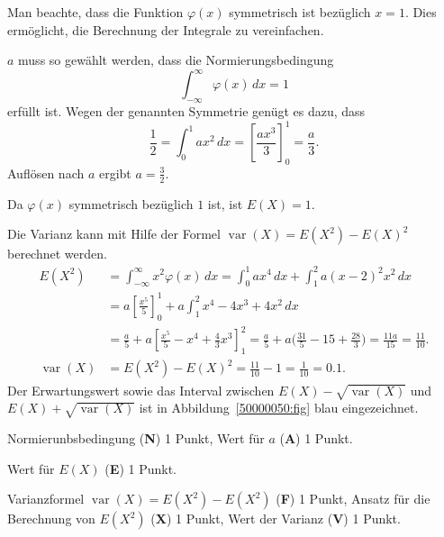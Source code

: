 \begin{loesung}
Man beachte, dass die Funktion $\varphi(x)$ symmetrisch ist bezüglich $x=1$.
Dies ermöglicht, die Berechnung der Integrale zu vereinfachen.
\begin{teilaufgaben}
\item
$a$ muss so gewählt werden, dass die Normierungsbedingung
\[
\int_{-\infty}^{\infty} \varphi(x)\,dx =1
\]
erfüllt ist.
Wegen der genannten Symmetrie genügt es dazu, dass
\[
\frac12
=
\int_0^1 ax^2\,dx
=
\left[
\frac{ax^3}3
\right]_0^1
=
\frac{a}{3}.
\]
Auflösen nach $a$ ergibt $a=\frac32$.
\item
Da $\varphi(x)$ symmetrisch bezüglich $1$ ist, ist $E(X)=1$.
\item
Die Varianz kann mit Hilfe der Formel $\operatorname{var}(X)=E(X^2)-E(X)^2$
berechnet werden.
\begin{align*}
E(X^2)
&=
\int_{-\infty}^\infty x^2\varphi(x)\,dx
=
\int_0^1 ax^4\,dx
+
\int_1^2 a(x-2)^2x^2\,dx
\\
&=
a\left[\frac{x^5}{5}\right]_0^1
+
a\int_1^2
x^4-4x^3+4x^2\,dx
\\
&=
\frac{a}5
+
a
\left[
\frac{x^5}5
-x^4
+\frac43x^3
\right]_1^2
=
\frac{a}5
+a\biggl(\frac{31}5-15+\frac{28}3\biggr)
=\frac{11a}{15}
=
\frac{11}{10}.
\\
\operatorname{var}(X)
&=
E(X^2) - E(X)^2
=
\frac{11}{10}-1
=
\frac{1}{10}
=
0.1.
\end{align*}
Der Erwartungswert sowie das Interval zwischen
$E(X)-\sqrt{\operatorname{var}(X)}$
und
$E(X)+\sqrt{\operatorname{var}(X)}$
ist in Abbildung~\ref{50000050:fig} blau eingezeichnet.
\qedhere
\end{teilaufgaben}
\end{loesung}

\begin{bewertung}
\begin{teilaufgaben}
\item Normierunbsbedingung ({\bf N}) 1 Punkt, Wert für $a$ ({\bf A}) 1 Punkt.
\item Wert für $E(X)$ ({\bf E}) 1 Punkt.
\item Varianzformel $\operatorname{var}(X)=E(X^2)-E(X^2)$ ({\bf F}) 1 Punkt,
Ansatz für die Berechnung von $E(X^2)$ ({\bf X}) 1 Punkt,
Wert der Varianz ({\bf V}) 1 Punkt.
\end{teilaufgaben}
\end{bewertung}
